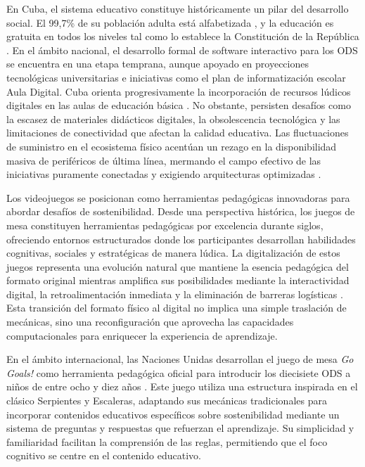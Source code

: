 En Cuba, el sistema educativo constituye históricamente un pilar del desarrollo social. El 99{,}7\% de su población adulta está alfabetizada \parencite{UNESCO2023}, y la educación es gratuita en todos los niveles tal como lo establece la Constitución de la República \parencite{CubaConstitucion2019}. En el ámbito nacional, el desarrollo formal de software interactivo para los ODS se encuentra en una etapa temprana, aunque apoyado en proyecciones tecnológicas universitarias e iniciativas como el plan de informatización escolar Aula Digital. Cuba orienta progresivamente la incorporación de recursos lúdicos digitales en las aulas de educación básica \parencite{InformeVoluntarioCuba2021}. No obstante, persisten desafíos como la escasez de materiales didácticos digitales, la obsolescencia tecnológica y las limitaciones de conectividad que afectan la calidad educativa. Las fluctuaciones de suministro en el ecosistema físico acentúan un rezago en la disponibilidad masiva de periféricos de última línea, mermando el campo efectivo de las iniciativas puramente conectadas y exigiendo arquitecturas optimizadas \parencite{BancoMundial2023}.

Los videojuegos se posicionan como herramientas pedagógicas innovadoras para abordar desafíos de sostenibilidad. Desde una perspectiva histórica, los juegos de mesa constituyen herramientas pedagógicas por excelencia durante siglos, ofreciendo entornos estructurados donde los participantes desarrollan habilidades cognitivas, sociales y estratégicas de manera lúdica. La digitalización de estos juegos representa una evolución natural que mantiene la esencia pedagógica del formato original mientras amplifica sus posibilidades mediante la interactividad digital, la retroalimentación inmediata y la eliminación de barreras logísticas \parencite{MartinezGimenes2023}. Esta transición del formato físico al digital no implica una simple traslación de mecánicas, sino una reconfiguración que aprovecha las capacidades computacionales para enriquecer la experiencia de aprendizaje.

En el ámbito internacional, las Naciones Unidas desarrollan el juego de mesa \textit{Go Goals!} como herramienta pedagógica oficial para introducir los diecisiete ODS a niños de entre ocho y diez años \parencite{GoGoals2020}. Este juego utiliza una estructura inspirada en el clásico Serpientes y Escaleras, adaptando sus mecánicas tradicionales para incorporar contenidos educativos específicos sobre sostenibilidad mediante un sistema de preguntas y respuestas que refuerzan el aprendizaje. Su simplicidad y familiaridad facilitan la comprensión de las reglas, permitiendo que el foco cognitivo se centre en el contenido educativo.

